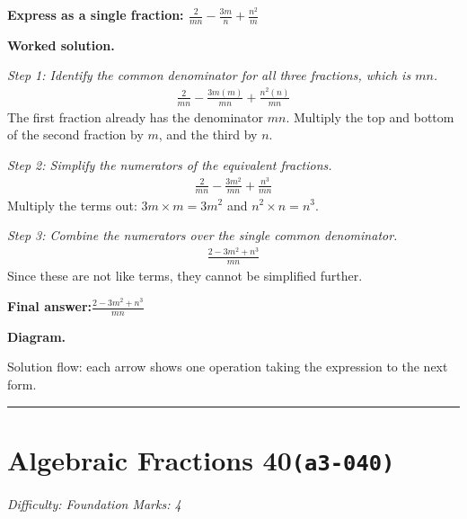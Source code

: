 \documentclass[11pt]{article}
\newcommand{\question}[1]{\par\medskip\noindent\textbf{#1}\par}
\begin{document}
\question{Express as a single fraction: \( \frac{2}{mn} - \frac{3m}{n} + \frac{n^2}{m} \)}

\textbf{Worked solution.}

\textit{Step 1: Identify the common denominator for all three fractions, which is \( mn \).}
\[\begin{gathered}
\frac{2}{mn} - \frac{3m(m)}{mn} + \frac{n^2(n)}{mn}
\end{gathered}\]
The first fraction already has the denominator \( mn \). Multiply the top and bottom of the second fraction by \( m \), and the third by \( n \).

\textit{Step 2: Simplify the numerators of the equivalent fractions.}
\[\begin{gathered}
\frac{2}{mn} - \frac{3m^2}{mn} + \frac{n^3}{mn}
\end{gathered}\]
Multiply the terms out: \( 3m \times m = 3m^2 \) and \( n^2 \times n = n^3 \).

\textit{Step 3: Combine the numerators over the single common denominator.}
\[\begin{gathered}
\frac{2 - 3m^2 + n^3}{mn}
\end{gathered}\]
Since these are not like terms, they cannot be simplified further.

\begin{answerbox}
\textbf{Final answer:}\quad \(\displaystyle \frac{2 - 3m^2 + n^3}{mn}\)
\end{answerbox}
\textbf{Diagram.}

\begin{center}
\end{center}
\small Solution flow: each arrow shows one operation taking the expression to the next form.\normalsize

\medskip\hrule

\section*{Algebraic Fractions 40\quad\small\texttt{(a3-040)}}
\textit{Difficulty: Foundation \quad\textbar\quad Marks: 4}
\end{document}
